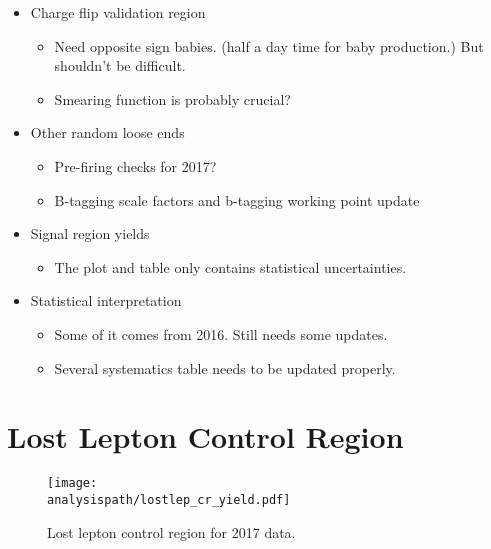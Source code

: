 \documentclass[12pt]{article}
\newcommand{\analysispath}{/home/users/phchang/public_html/analysis/www/code/WWWAnalysisRun2/analysis/plots/WWW2017_v5.0.0/test32}
\begin{document}
\begin{itemize}
    \item Charge flip validation region
        \begin{itemize}
            \item Need opposite sign babies. (half a day time for baby production.) But shouldn't be difficult.
            \item Smearing function is probably crucial?
        \end{itemize}
    \item Other random loose ends
        \begin{itemize}
            \item Pre-firing checks for 2017?
            \item B-tagging scale factors and b-tagging working point update
        \end{itemize}
    \item Signal region yields
        \begin{itemize}
            \item The plot and table only contains statistical uncertainties.
        \end{itemize}
    \item Statistical interpretation
        \begin{itemize}
            \item Some of it comes from 2016. Still needs some updates.
            \item Several systematics table needs to be updated properly.
        \end{itemize}
\end{itemize}


\section{Lost Lepton Control Region}



\begin{figure}[!htb]
    \centering
    \texttt{[image: \\analysispath/lostlep\_cr\_yield.pdf]}
    \caption{
        \label{fig:2017:lostlepcr} Lost lepton control region for 2017 data.
    }
\end{figure}



\end{document}
